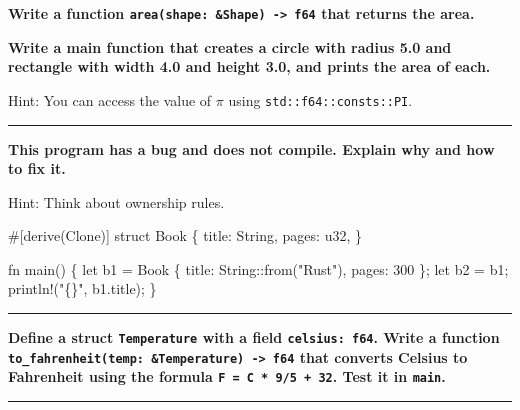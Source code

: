 \documentclass[
  11pt,
]{article}
\newenvironment{Shaded}{}{}
\newcommand{\NormalTok}[1]{#1}
\begin{document}
\textbf{Write a function
\texttt{area(shape:\ \&Shape)\ -\textgreater{}\ f64} that returns the
area.}

\textbf{Write a main function that creates a circle with radius 5.0 and
rectangle with width 4.0 and height 3.0, and prints the area of each.}

Hint: You can access the value of \(\pi\) using
\texttt{std::f64::consts::PI}.

\begin{Shaded}
\begin{Highlighting}[]

\end{Highlighting}
\end{Shaded}

\begin{center}\rule{0.5\linewidth}{0.5pt}\end{center}

\textbf{This program has a bug and does not compile. Explain why and how
to fix it.}

Hint: Think about ownership rules.

\begin{Shaded}
\begin{Highlighting}[]
\NormalTok{\#[derive(Clone)]}
\NormalTok{struct Book \{}
\NormalTok{    title: String,}
\NormalTok{    pages: u32,}
\NormalTok{\}}

\NormalTok{fn main() \{}
\NormalTok{    let b1 = Book \{ title: String::from("Rust"), pages: 300 \};}
\NormalTok{    let b2 = b1;}
\NormalTok{    println!("\{\}", b1.title);}
\NormalTok{\}}
\end{Highlighting}
\end{Shaded}

\begin{center}\rule{0.5\linewidth}{0.5pt}\end{center}

\textbf{Define a struct \texttt{Temperature} with a field
\texttt{celsius:\ f64}. Write a function
\texttt{to\_fahrenheit(temp:\ \&Temperature)\ -\textgreater{}\ f64} that
converts Celsius to Fahrenheit using the formula
\texttt{F\ =\ C\ *\ 9/5\ +\ 32}. Test it in \texttt{main}.}

\begin{Shaded}
\begin{Highlighting}[]

\end{Highlighting}
\end{Shaded}

\begin{center}\rule{0.5\linewidth}{0.5pt}\end{center}
\end{document}
